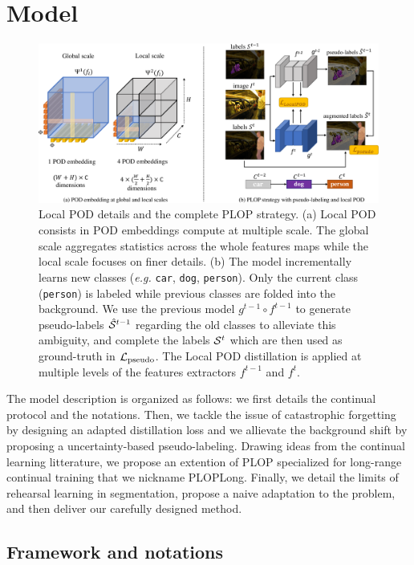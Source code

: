 \section{Model}

\begin{figure}[ht!]
    \centering
    \includegraphics[width=0.8\linewidth]{images/seg/plop_strategy.pdf}
    \caption{Local POD details and the complete PLOP strategy. (a) Local POD consists in POD
        embeddings compute at multiple scale. The global scale aggregates statistics across the whole
        features maps while the local scale focuses on finer details.  (b) The model incrementally
        learns new classes (\textit{e.g.} \texttt{car}, \texttt{dog}, \texttt{person}). Only the current
        class (\texttt{person}) is labeled while previous classes are folded into the background. We use
        the previous model $g^{t-1} \circ f^{t-1}$ to generate pseudo-labels $\hat{\mathcal{S}}^{t-1}$
        regarding the old classes to alleviate this ambiguity, and complete the labels $\mathcal{S}^t$ which
        are then used as ground-truth in $\mathcal{L}_\text{pseudo}$. The Local POD distillation is applied at
        multiple levels of the features extractors $f^{t-1}$ and $f^t$.}
    \label{fig:model_plop}
\end{figure}


The model description is organized as follows: we first details the continual protocol and the
notations. Then, we tackle the issue of catastrophic forgetting by designing an adapted distillation
loss and we allievate the background shift by proposing a uncertainty-based pseudo-labeling. Drawing
ideas from the continual learning litterature, we propose an extention of PLOP specialized for
long-range continual training that we nickname PLOPLong. Finally, we detail the limits of rehearsal
learning in segmentation, propose a naive adaptation to the problem, and then deliver our carefully
designed method.

\subsection{Framework and notations}\label{sec:overview}

